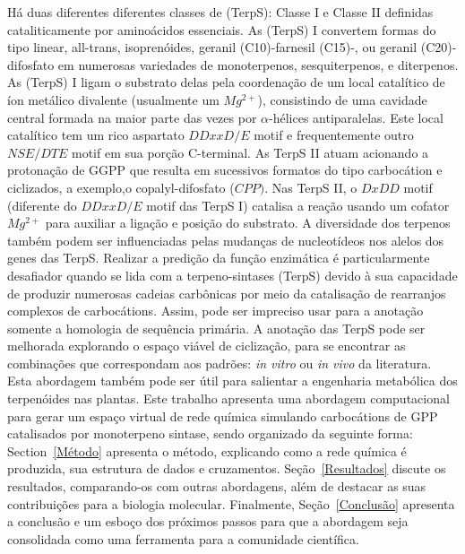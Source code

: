 Há duas diferentes diferentes classes de  (TerpS): Classe I e Classe II definidas cataliticamente por aminoácidos essenciais. As (TerpS) I convertem formas do tipo linear, all-trans, isoprenóides, geranil (C10)\nobreakdash-farnesil (C15)\nobreakdash-, ou geranil (C20)-difosfato em numerosas variedades de monoterpenos, sesquiterpenos, e diterpenos. As (TerpS) I ligam o substrato delas pela coordenação de um local catalítico de íon metálico divalente (usualmente um $Mg^{2+}$), consistindo de uma cavidade central formada na maior parte das vezes por $\alpha$-hélices antiparalelas. 
Este local catalítico tem um rico aspartato $DDxxD/E$ motif e frequentemente outro $NSE/DTE$ motif em sua porção C-terminal.
As TerpS II atuam acionando a protonação de GGPP que resulta em sucessivos formatos do tipo carbocátion e ciclizados, a exemplo,o copalyl-difosfato ($CPP)$. Nas TerpS II, o $DxDD$ motif (diferente do $DDxxD/E$ motif das TerpS I) catalisa a reação usando um cofator $Mg^{2+}$ para auxiliar a ligação e posição do substrato. A diversidade dos terpenos também podem ser influenciadas pelas mudanças de nucleotídeos nos alelos dos genes das TerpS.
Realizar a predição da função enzimática é particularmente desafiador quando se lida com a terpeno-sintases (TerpS) devido à sua capacidade de produzir numerosas cadeias carbônicas por meio da catalisação de rearranjos complexos de carbocátions. Assim, pode ser impreciso usar para a anotação somente a homologia de sequência primária. A anotação das TerpS pode ser melhorada explorando o espaço viável de ciclização, para se encontrar as combinações que correspondam aos padrões: {\it in vitro} ou {\it in vivo} da literatura. Esta abordagem também pode ser útil para salientar a engenharia metabólica dos terpenóides nas plantas.
Este trabalho apresenta uma abordagem computacional para gerar um espaço virtual de rede química simulando carbocátions de GPP catalisados por monoterpeno sintase, sendo organizado da seguinte forma: Section~\ref{Método} apresenta o método, explicando como a rede química é produzida, sua estrutura de dados e cruzamentos. Seção~\ref{Resultados} discute os resultados, comparando-os com outras abordagens, além de destacar as suas contribuições para a biologia molecular.
Finalmente, Seção~\ref{Conclusão} apresenta a conclusão e um esboço dos próximos passos para que a abordagem seja consolidada como uma ferramenta para a comunidade científica.


